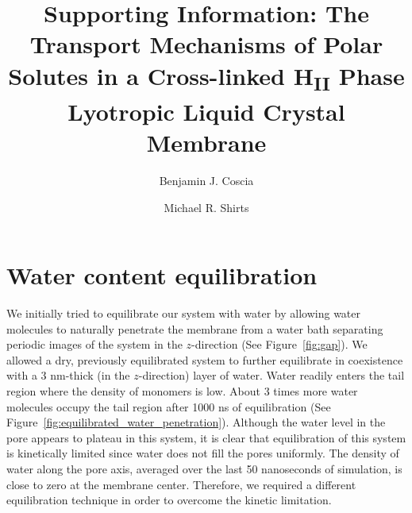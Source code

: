 \documentclass{article}
\title{Supporting Information: The Transport Mechanisms of Polar Solutes in a Cross-linked H\textsubscript{II} Phase Lyotropic Liquid Crystal Membrane}
\author{Benjamin J. Coscia \and Michael R. Shirts}
\begin{document}
  \maketitle
  \graphicspath{{./supporting_figures/}}
  

  \section{Water content equilibration}\label{section:water_content_equil}

  We initially tried to equilibrate our system with water by allowing water
  molecules to naturally penetrate the membrane from a water bath separating
  periodic images of the system in the $z$-direction (See Figure~\ref{fig:gap}).
  We allowed a dry, previously equilibrated system to further equilibrate in
  coexistence with a 3 nm-thick (in the $z$-direction) layer of water. Water
  readily enters the tail region where the density of monomers is low. About 3
  times more water molecules occupy the tail region after 1000 ns of
  equilibration (See Figure~\ref{fig:equilibrated_water_penetration}). Although
  the water level in the pore appears to plateau in this system, it is clear that
  equilibration of this system is kinetically limited since water does not fill
  the pores uniformly. The density of water along the pore axis, averaged over
  the last 50 nanoseconds of simulation, is close to zero at the membrane center.
  Therefore, we required a different equilibration technique in order to overcome
  the kinetic limitation.
\end{document}

